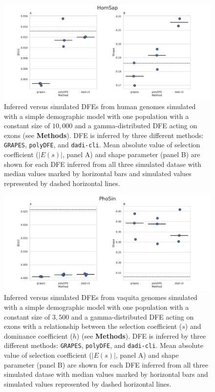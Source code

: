 \documentclass[hidelinks]{article}
\newcommand{\polydfe}{\texttt{polyDFE}\xspace}
\newcommand{\dadicli}{\texttt{dadi-cli}\xspace}
\newcommand{\grapes}{\texttt{GRAPES}\xspace}
\begin{document}
\begin{figure}[h]
    \centering
    \includegraphics[width=\textwidth]{figures/HomSap/Constant/HomSap_Constant_Gamma_K17_ensembl_havana_104_exons_DFE_plot}
    \caption{
       Inferred versus simulated DFEs from human genomes simulated with
       a simple demographic model with one population with a constant size of $10,000$
       and a gamma-distributed DFE acting on exons (see \textbf{Methods}).
        DFE is inferred by three different methods: \grapes, \polydfe , and \dadicli.
        Mean absolute value of selection coefficient ($\lvert E(s) \rvert$, panel A) and shape parameter (panel B)
        are shown for each DFE inferred from all three simulated datase
        with median values marked by horizontal bars
        and simulated values represented by dashed horizontal lines.
    }
    \label{fig:homsap-dfe.constant}    
\end{figure}

\begin{figure}
    \centering
    \includegraphics[width=\textwidth]{figures/PhoSin/Constant/PhoSin_Constant_Gamma_R22_Phocoena_sinus.mPhoSin1.pri.110_exons_DFE_plot.pdf}
    \caption{
    \label{fig:vaquita-dfe.constant}
        Inferred versus simulated DFEs from vaquita genomes simulated with
        a simple demographic model with one population with a constant size of $3,500$
        and a gamma-distributed DFE acting on exons 
        with a relationship between the selection coefficient ($s$) and dominance coefficient ($h$) (see \textbf{Methods}).
        DFE is inferred by three different methods: \grapes, \polydfe , and \dadicli.
        Mean absolute value of selection coefficient ($\lvert E(s) \rvert$, panel A) and shape parameter (panel B)
        are shown for each DFE inferred from all three simulated datase
        with median values marked by horizontal bars
        and simulated values represented by dashed horizontal lines.
    }
\end{figure}
\end{document}
